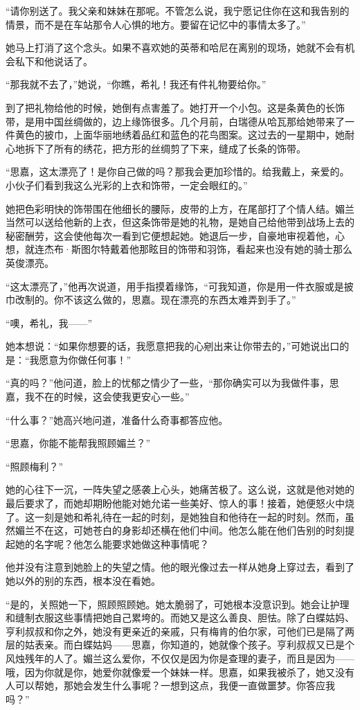 \par “请你别送了。我父亲和妹妹在那呢。不管怎么说，我宁愿记住你在这和我告别的情景，而不是在车站那令人心惧的地方。要留在记忆中的事情太多了。”
\par 她马上打消了这个念头。如果不喜欢她的英蒂和哈尼在离别的现场，她就不会有机会私下和他说话了。
\par “那我就不去了，”她说，“你瞧，希礼！我还有件礼物要给你。”
\par 到了把礼物给他的时候，她倒有点害羞了。她打开一个小包。这是条黄色的长饰带，是用中国丝绸做的，边上缘饰很多。几个月前，白瑞德从哈瓦那给她带来了一件黄色的披巾，上面华丽地绣着品红和蓝色的花鸟图案。这过去的一星期中，她耐心地拆下了所有的绣花，把方形的丝绸剪了下来，缝成了长条的饰带。
\par “思嘉，这太漂亮了！是你自己做的吗？那我会更加珍惜的。给我戴上，亲爱的。小伙子们看到我这么光彩的上衣和饰带，一定会眼红的。”
\par 她把色彩明快的饰带围在他细长的腰际，皮带的上方，在尾部打了个情人结。媚兰当然可以送给他新的上衣，但这条饰带是她的礼物，是她自己给他带到战场上去的秘密酬劳，这会使他每次一看到它便想起她。她退后一步，自豪地审视着他，心想，就连杰布·斯图尔特戴着他那眩目的饰带和羽饰，看起来也没有她的骑士那么英俊漂亮。
\par “这太漂亮了，”他再次说道，用手指摸着缘饰，“可我知道，你是用一件衣服或是披巾改制的。你不该这么做的，思嘉。现在漂亮的东西太难弄到手了。”
\par “噢，希礼，我——”
\par 她本想说：“如果你想要的话，我愿意把我的心剜出来让你带去的，”可她说出口的是：“我愿意为你做任何事！”
\par “真的吗？”他问道，脸上的忧郁之情少了一些，“那你确实可以为我做件事，思嘉，我不在的时候，这会使我更安心一些。”
\par “什么事？”她高兴地问道，准备什么奇事都答应他。
\par “思嘉，你能不能帮我照顾媚兰？”
\par “照顾梅利？”
\par 她的心往下一沉，一阵失望之感袭上心头，她痛苦极了。这么说，这就是他对她的最后要求了，而她却期盼他能对她允诺一些美好、惊人的事！接着，她便怒火中烧了。这一刻是她和希礼待在一起的时刻，是她独自和他待在一起的时刻。然而，虽然媚兰不在这，可她苍白的身影却还横在他们中间。他怎么能在他们告别的时刻提起她的名字呢？他怎么能要求她做这种事情呢？
\par 他并没有注意到她脸上的失望之情。他的眼光像过去一样从她身上穿过去，看到了她以外的别的东西，根本没在看她。
\par “是的，关照她一下，照顾照顾她。她太脆弱了，可她根本没意识到。她会让护理和缝制衣服这些事情把她自己累垮的。而她又是这么善良、胆怯。除了白蝶姑妈、亨利叔叔和你之外，她没有更亲近的亲戚，只有梅肯的伯尔家，可他们已是隔了两层的姑表亲。而白蝶姑妈——思嘉，你知道的，她就像个孩子。亨利叔叔又已是个风烛残年的人了。媚兰这么爱你，不仅仅是因为你是查理的妻子，而且是因为——哦，因为你就是你，她爱你就像爱一个妹妹一样。思嘉，如果我被杀了，她又没有人可以帮她，那她会发生什么事呢？一想到这点，我便一直做噩梦。你答应我吗？”
